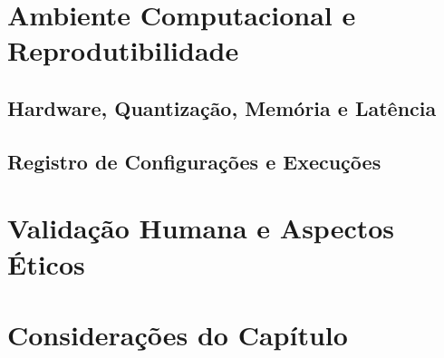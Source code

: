 \section{Ambiente Computacional e Reprodutibilidade}

\subsection{Hardware, Quantização, Memória e Latência}

\subsection{Registro de Configurações e Execuções}

\section{Validação Humana e Aspectos Éticos}


\section{Considerações do Capítulo}
